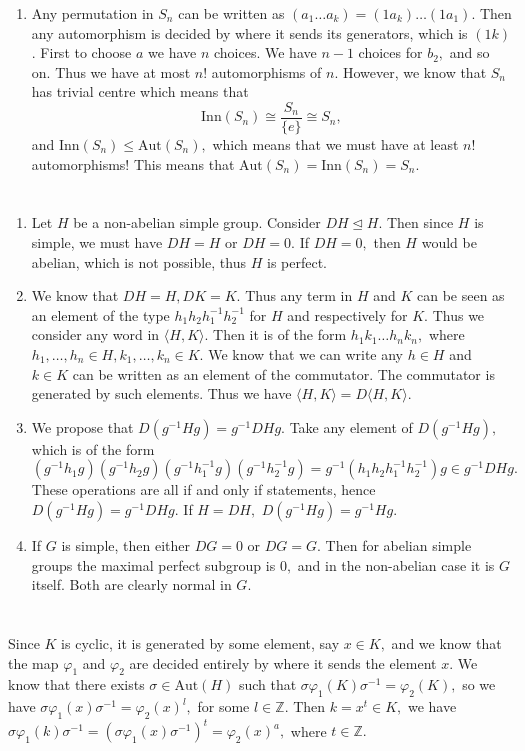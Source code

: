 \documentclass{article}
\begin{document}
\begin{enumerate}
	\item Any permutation in $S_n$ can be written as $(a_1 \dots a_k)= (1 a_k)\dots (1 a_1).$ Then any automorphism is decided by where it sends its 
	generators, which is $(1 k)$. First to choose $a$ we have $n$ choices. We have $n-1$ choices for $b_2,$ and so on. Thus we have at most $n!$ 
	automorphisms of $n.$ However, we know that $S_n$ has trivial centre which means that 
	$$\text{Inn}(S_n) \cong \frac{S_n}{\{e\}} \cong S_n,$$ and $\text{Inn}(S_n) \leq \text{Aut}(S_n),$ which means that we must have at least $n!$ 
	automorphisms! This means that $\text{Aut}(S_n)=\text{Inn}(S_n)=S_n.$
\end{enumerate}
\section{} %
\begin{enumerate}
	\item Let $H$ be a non-abelian simple group. Consider $DH \trianglelefteq H.$ Then since $H$ is simple, we must have $DH= H$ or $DH=0.$ If $DH=0,$ then 
	$H$ would be abelian, which is not possible, thus $H$ is perfect.
	\item We know that $DH=H, DK=K.$ Thus any term in $H$ and $K$ can be seen as an element of the type $h_1h_2h_1^{-1}h_2^{-1}$ for $H$ and respectively 
	for $K.$ Thus we consider any word in $\langle H,K \rangle.$ Then it is of the form $h_1k_1 \dots h_n k_n,$ where $h_1,\dots, h_n \in H, k_1,\dots, k_n 
	\in K.$ We know that we can write any $h \in H$ and $k \in K$ can be written as an element of the commutator. The commutator is generated by such 
	elements. Thus we have $\langle H,K \rangle= D\langle H,K \rangle.$ 
	
	\item We propose that $D(g^{-1}Hg)=g^{-1}DHg.$ Take any element of $D(g^{-1}Hg),$ which is of the form 
	$(g^{-1}h_1g)(g^{-1}h_2g)(g^{-1}h_1^{-1}g)(g^{-1}h_2^{-1}g)=g^{-1}(h_1h_2h_1^{-1}h_2^{-1})g \in g^{-1}DHg.$ These operations are all if and only if 
	statements, hence $D(g^{-1}Hg)=g^{-1}DHg.$ If $H=DH,$ $D(g^{-1}Hg)=g^{-1}Hg.$
	\item If $G$ is simple, then either $DG=0$ or $DG=G.$ Then for abelian simple groups the maximal perfect subgroup is $0,$ and in the non-abelian case it 
	is $G$ itself. Both are clearly normal in $G.$ 
\end{enumerate}
\section{} %
Since $K$ is cyclic, it is generated by some element, say $x \in K,$ and we know that the map $\varphi_1$ and $\varphi_2$ are decided entirely by where it 
sends the element $x.$ We know that there exists $\sigma \in \text{Aut}(H)$ such that $\sigma \varphi_1(K) \sigma^{-1}= \varphi_2(K),$ so we have
$\sigma \varphi_1(x) \sigma^{-1} = \varphi_2(x)^l,$ for some $l \in \mathbb{Z}.$ Then $k=x^t \in K,$ we have $\sigma \varphi_1(k) \sigma^{-1}=(\sigma 
\varphi_1(x) \sigma^{-1})^t= \varphi_2(x)^{a},$ where $t \in \mathbb{Z}.$  
\end{document}

